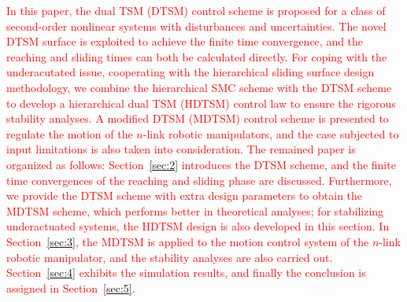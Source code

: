 \documentclass[3p]{elsarticle}
\theoremstyle{plain}
\theoremstyle{remark}
\begin{document}
\textcolor{red}{In this paper, the dual TSM (DTSM) control scheme is proposed for a class of second-order nonlinear systems with disturbances and uncertainties. The novel DTSM surface is exploited to achieve the finite time convergence, and the reaching and sliding times can both be calculated directly. For coping with the underacutated issue, cooperating with the hierarchical sliding surface design methodology, we combine the hierarchical SMC scheme with the DTSM scheme to develop a hierarchical dual TSM (HDTSM) control law to ensure the rigorous stability analyses. A modified DTSM (MDTSM) control scheme is presented to regulate the motion of the $n$-link robotic manipulators, and the case subjected to input limitations is also taken into consideration. The remained paper is organized as follows: Section~\ref{sec:2} introduces the DTSM scheme, and the finite time convergences of the reaching and sliding phase are discussed. Furthermore, we provide the DTSM scheme with extra design parameters to obtain the MDTSM scheme, which performs better in theoretical analyses; for stabilizing underactuated systems, the HDTSM design is also developed in this section. In Section~\ref{sec:3}, the MDTSM is applied to the motion control system of the $n$-link robotic  manipulator, and the stability analyses are also carried out. Section~\ref{sec:4} exhibits the simulation results, and finally the conclusion is assigned in Section~\ref{sec:5}.}
\end{document}
